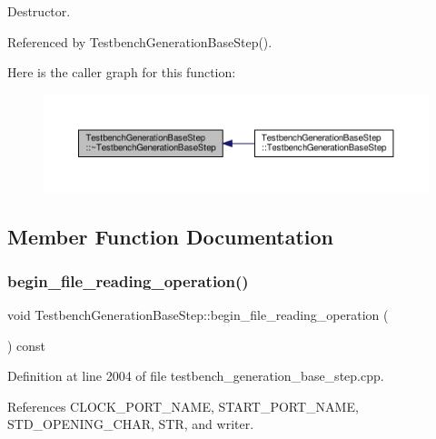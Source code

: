Destructor. 



Referenced by Testbench\+Generation\+Base\+Step().

Here is the caller graph for this function\+:
\nopagebreak
\begin{figure}[H]
\begin{center}
\leavevmode
\includegraphics[width=350pt]{dc/d02/classTestbenchGenerationBaseStep_a474ad98fb32935847aa4050e3aa8f979_icgraph}
\end{center}
\end{figure}


\subsection{Member Function Documentation}
\mbox{\label{classTestbenchGenerationBaseStep_ab0b8f178bb3899f2d4a0ba1537673fbc}} 
\subsubsection{\texorpdfstring{begin\+\_\+file\+\_\+reading\+\_\+operation()}{begin\_file\_reading\_operation()}}
{\footnotesize\ttfamily void Testbench\+Generation\+Base\+Step\+::begin\+\_\+file\+\_\+reading\+\_\+operation (\begin{DoxyParamCaption}{ }\end{DoxyParamCaption}) const\hspace{0.3cm}{\ttfamily [protected]}}



Definition at line 2004 of file testbench\+\_\+generation\+\_\+base\+\_\+step.\+cpp.



References C\+L\+O\+C\+K\+\_\+\+P\+O\+R\+T\+\_\+\+N\+A\+ME, S\+T\+A\+R\+T\+\_\+\+P\+O\+R\+T\+\_\+\+N\+A\+ME, S\+T\+D\+\_\+\+O\+P\+E\+N\+I\+N\+G\+\_\+\+C\+H\+AR, S\+TR, and writer.



